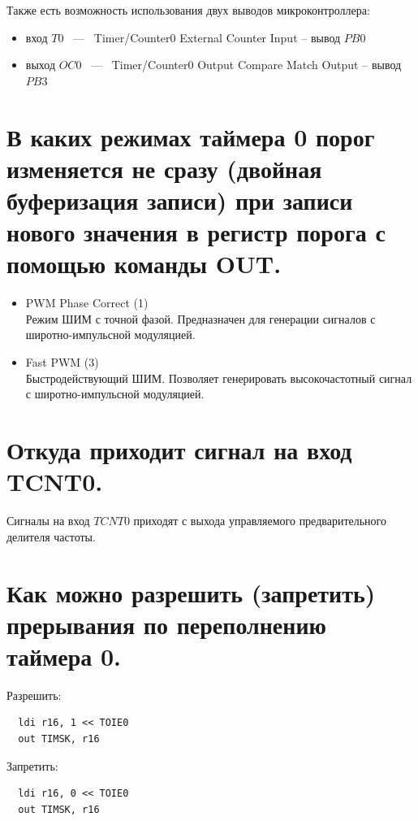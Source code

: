 Также есть возможность использования двух выводов микроконтроллера:
\begin{itemize}
  \item вход $T0$ ~---~ Timer/Counter0 External Counter Input -- вывод $PB0$
  \item выход $OC0$ ~---~ Timer/Counter0 Output Compare Match Output -- вывод $PB3$
\end{itemize}

\section{В каких режимах таймера 0 порог изменяется не сразу (двойная буферизация записи) при записи нового значения в регистр порога с помощью команды OUT. }
\begin{itemize}
  \item PWM Phase Correct (1)\\
Режим ШИМ с точной фазой. Предназначен для генерации сигналов с
широтно-импульсной модуляцией.
  \item Fast PWM (3) \\
Быстродействующий ШИМ. Позволяет генерировать высокочастотный сигнал
с широтно-импульсной модуляцией.
\end{itemize}

\section{Откуда приходит сигнал на вход TCNT0.}
Сигналы на вход $TCNT0$ приходят с выхода управляемого предварительного 
делителя частоты.


\section{Как можно разрешить (запретить) прерывания по переполнению таймера 0.}
Разрешить:
\begin{verbatim}
  ldi r16, 1 << TOIE0
  out TIMSK, r16
\end{verbatim}

Запретить:
\begin{verbatim}
  ldi r16, 0 << TOIE0
  out TIMSK, r16
\end{verbatim}

